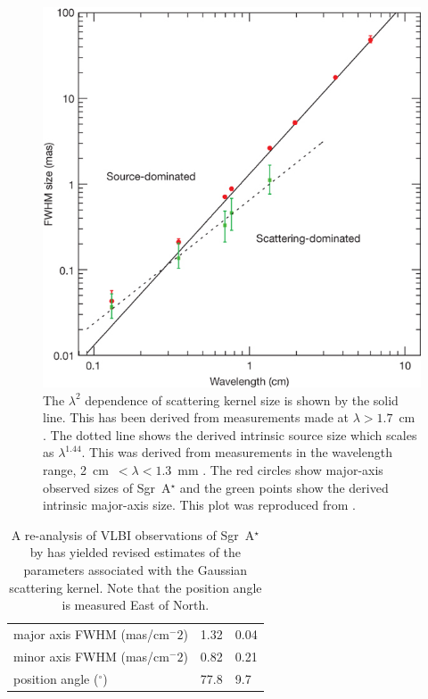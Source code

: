 \begin{figure}
\includegraphics[width=0.8\columnwidth]{Images/scattering_law}
\caption[The $\lambda^2$ dependence of ISM scattering kernel size is shown by the solid line. The dotted line shows the derived intrinsic source size which scales as $\lambda^{1.44}$.]{The $\lambda^2$ dependence of scattering kernel size is shown by the solid line. This has been derived from measurements made at $\lambda > 1.7$~cm \protect\cite{Bower_2006}. The dotted line shows the derived intrinsic source size which scales as $\lambda^{1.44}$. This was derived from measurements in the wavelength range, 2~cm~$< \lambda < 1.3$~mm \citep{Doeleman_2008}. The red circles show major-axis observed sizes of Sgr~A$^\star$  and the green points show the derived intrinsic major-axis size. This plot was reproduced from \protect\citet{Doeleman_2008}.\label{fig:scattering_law}
}
\end{figure}
\begin{table}[]
\centering
\caption[A re-analysis of VLBI observations of Sgr~A$^\star$ by \citet{Psaltis_2015} has yielded revised estimates of the parameters associated with the Gaussian scattering kernel.]{A re-analysis of VLBI observations of Sgr~A$^\star$ by \citet{Psaltis_2015} has yielded revised estimates of the parameters associated with the Gaussian scattering kernel. Note that the position angle is measured East of North. \label{tab:ism_gauss}}
\begin{tabular}{l|ll}
\hline
major axis FWHM (mas/cm$^-2$)& 1.32 & 0.04 \\
minor axis FWHM (mas/cm$^-2$)& 0.82 & 0.21 \\
position angle ($^\circ$)& 77.8 & 9.7\\  
\hline
\end{tabular}
\end{table}


